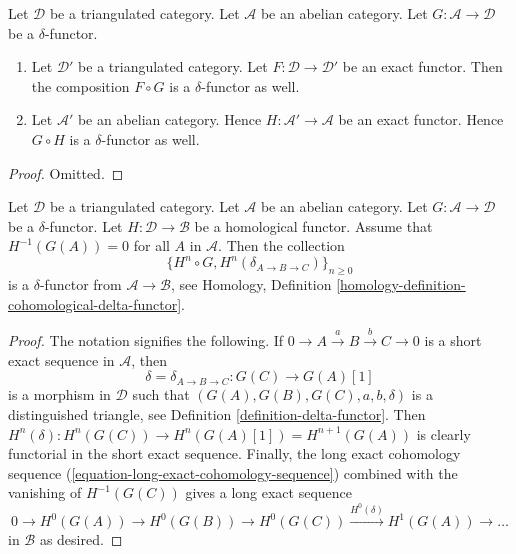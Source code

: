 \begin{lemma}
\label{lemma-exact-compose-delta-functor}
Let $\mathcal{D}$ be a triangulated category.
Let $\mathcal{A}$ be an abelian category.
Let $G : \mathcal{A} \to \mathcal{D}$ be a $\delta$-functor.
\begin{enumerate}
\item Let $\mathcal{D}'$ be a triangulated category.
Let $F : \mathcal{D} \to \mathcal{D}'$ be an exact functor.
Then the composition $F \circ G$ is a $\delta$-functor as well.
\item Let $\mathcal{A}'$ be an abelian category. Hence
$H : \mathcal{A}' \to \mathcal{A}$ be an exact functor.
Hence $G \circ H$ is a $\delta$-functor as well.
\end{enumerate}
\end{lemma}

\begin{proof}
Omitted.
\end{proof}

\begin{lemma}
\label{lemma-compose-delta-functor-homological}
Let $\mathcal{D}$ be a triangulated category.
Let $\mathcal{A}$ be an abelian category.
Let $G : \mathcal{A} \to \mathcal{D}$ be a $\delta$-functor.
Let $H : \mathcal{D} \to \mathcal{B}$ be a homological functor.
Assume that $H^{-1}(G(A)) = 0$ for all $A$ in $\mathcal{A}$.
Then the collection
$$
\{H^n \circ G, H^n(\delta_{A \to B \to C})\}_{n \geq 0}
$$
is a $\delta$-functor from $\mathcal{A} \to \mathcal{B}$, see
Homology, Definition \ref{homology-definition-cohomological-delta-functor}.
\end{lemma}

\begin{proof}
The notation signifies the following. If
$0 \to A \xrightarrow{a} B \xrightarrow{b} C \to 0$ is
a short exact sequence in $\mathcal{A}$, then
$$
\delta = \delta_{A \to B \to C} : G(C) \to G(A)[1]
$$
is a morphism in $\mathcal{D}$ such that
$(G(A), G(B), G(C), a, b, \delta)$ is
a distinguished triangle, see
Definition \ref{definition-delta-functor}.
Then $H^n(\delta) : H^n(G(C)) \to H^n(G(A)[1]) = H^{n + 1}(G(A))$
is clearly functorial in the short exact sequence.
Finally, the long exact cohomology sequence
(\ref{equation-long-exact-cohomology-sequence})
combined with the vanishing of $H^{-1}(G(C))$
gives a long exact sequence
$$
0 \to H^0(G(A)) \to H^0(G(B)) \to H^0(G(C))
\xrightarrow{H^0(\delta)} H^1(G(A)) \to \ldots
$$
in $\mathcal{B}$ as desired.
\end{proof}

